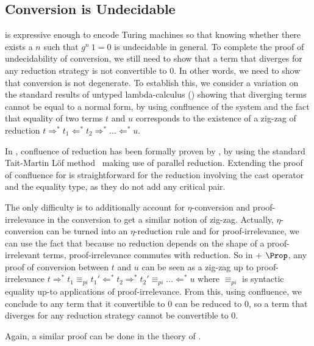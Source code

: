   \subsection{Conversion is Undecidable}
  
  \SetoidCC is expressive enough to encode Turing machines so that
  knowing whether there exists a \( n \) such that \( g^n\ 1 = 0 \) is
  undecidable in general.
  To complete the proof of undecidability of conversion, we still need
  to show that a term that diverges for any reduction strategy is not
  convertible to $0$. In other words, we need to show that conversion is
  not degenerate.
  To establish this, we consider a variation on the standard results of untyped
  lambda-calculus () showing that diverging terms
  cannot be equal to a normal form, by using confluence of the system
  and the fact that equality of two terms $t$ and $u$ corresponds to the
  existence of a zig-zag of reduction $t \Rightarrow^* t_1 \Leftarrow^*
  t_2\Rightarrow^*\dots \Leftarrow^* u$.
  
  In \CIC, confluence of reduction has been formally proven by
  , by using the standard Tait-Martin Löf
  method~ making use of parallel
  reduction.
  Extending the proof of confluence for \SetoidCC is straightforward for
  the reduction involving the cast operator and the equality type, as
  they do not add any critical pair.
  
  The only difficulty is to additionally account for $\eta$-conversion
  and proof-irrelevance in the conversion to get a similar notion of
  zig-zag.
  Actually, $\eta$-conversion can be turned into an
  $\eta$-reduction rule and for proof-irrelevance, we can use the fact
  that because no reduction depends on the shape of a proof-irrelevant
  terms, proof-irrelevance commutes with reduction.
  So in \SetoidCC + $\Prop$, any proof of conversion between $t$ and $u$
  can be seen as a zig-zag up to proof-irrelevance
  $t \Rightarrow^* t_1 \equiv_{pi} t_1' \Leftarrow^*
  t_2\Rightarrow ^* t_2' \equiv_{pi} \dots \Leftarrow^* u$ where $\equiv_{pi}$ is syntactic
  equality up-to applications of proof-irrelevance.
  From this, using confluence, we conclude to any term that it convertible to $0$ can be
  reduced to $0$, so a term that diverges for any reduction strategy
  cannot be convertible to $0$.
  
  Again, a similar proof can be done in the theory of .